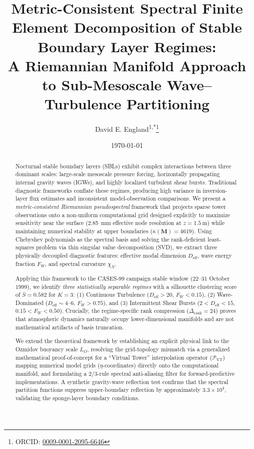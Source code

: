 \documentclass[11pt,a4paper]{article}
\title{Metric-Consistent Spectral Finite Element Decomposition of Stable Boundary Layer Regimes: \\
A Riemannian Manifold Approach to Sub-Mesoscale Wave--Turbulence Partitioning}
\author{David E. England\textsuperscript{1,*}\thanks{ORCID: \href{<https://orcid.org/0009-0001-2095-6646}{0009-0001-2095-6646}}}>
\affil{\textsuperscript{1}The University of Alabama in Huntsville, 301 Sparkman Drive, Huntsville, AL 35899, USA}
\affil{\textsuperscript{*}Corresponding author: <David.England@UAH.Edu>}
\date{\today}
\begin{document}
\maketitle

\begin{abstract}
Nocturnal stable boundary layers (SBLs) exhibit complex interactions between three dominant scales: large-scale mesoscale pressure forcing, horizontally propagating internal gravity waves (IGWs), and highly localized turbulent shear bursts. Traditional diagnostic frameworks conflate these regimes, producing high variance in inversion-layer flux estimates and inconsistent model-observation comparisons. We present a \emph{metric-consistent Riemannian pseudospectral} framework that projects sparse tower observations onto a non-uniform computational grid designed explicitly to maximize sensitivity near the surface (\SI{2.85}{\milli\meter} effective node resolution at $z = \SI{1.5}{\meter}$) while maintaining numerical stability at upper boundaries ($\kappa(\mathbf{M}) = 4619$). Using Chebyshev polynomials as the spectral basis and solving the rank-deficient least-squares problem via thin singular value decomposition (SVD), we extract three physically decoupled diagnostic features: effective modal dimension $D_{\mathrm{eff}}$, wave energy fraction $F_W$, and spectral curvature $\chi_N$.

Applying this framework to the CASES-99 campaign stable window (22--31 October 1999), we identify \emph{three statistically separable regimes} with a silhouette clustering score of $\bar{S} = 0.582$ for $K=3$: (1) Continuous Turbulence ($D_{\mathrm{eff}} > 20$, $F_W < 0.15$), (2) Wave-Dominated ($D_{\mathrm{eff}} \sim 4$--$6$, $F_W > 0.75$), and (3) Intermittent Shear Bursts ($2 < D_{\mathrm{eff}} < 15$, $0.15 < F_W < 0.50$). Crucially, the regime-specific rank compression ($\Delta_{\mathrm{rank}} = 24$) proves that atmospheric dynamics naturally occupy lower-dimensional manifolds and are not mathematical artifacts of basis truncation.

We extend the theoretical framework by establishing an explicit physical link to the Ozmidov buoyancy scale $L_O$, resolving the grid-topology mismatch via a generalized mathematical proof-of-concept for a ``Virtual Tower'' interpolation operator ($\mathcal{P}_{\text{VT}}$) mapping numerical model grids ($\eta$-coordinates) directly onto the computational manifold, and formulating a $2/3$-rule spectral anti-aliasing filter for forward-predictive implementations. A synthetic gravity-wave reflection test confirms that the spectral partition functions suppress upper-boundary reflection by approximately $3.3\times 10^4$, validating the sponge-layer boundary conditions.
\end{abstract}
\end{document}
